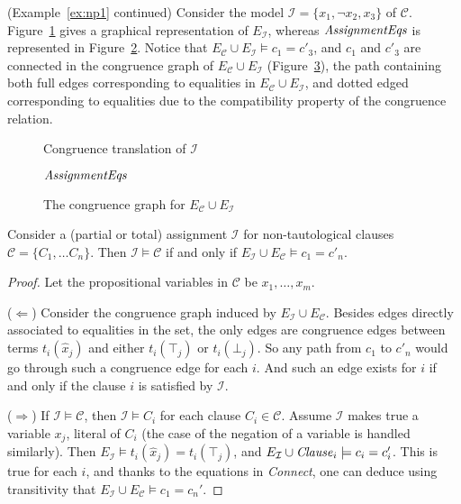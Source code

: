 \documentclass[smallextended]{svjour3}
\newcommand{\Assignment}{{\it AssignmentEqs}}
\newcommand{\Clause}{{\it Clause}}
\newcommand{\Connect}{{\it Connect}}
\begin{document}
\begin{example}\label{ex:np2} (Example~\ref{ex:np1} continued)  
Consider the model $\mathcal{I} = \{x_1, \neg x_2, x_3\}$ of\/ $\mathcal{C}$.
Figure~\ref{fig:npassignment} gives a graphical representation of
$E_{\mathcal{I}}$, whereas $\Assignment$ is represented in
Figure~\ref{fig:npassignmentstar}.  Notice that
$E_{\mathcal{C}} \cup E_{\mathcal{I}} \models c_1 = c'_3$,
and $c_1$ and $c'_3$ are connected in the congruence graph
of $E_{\mathcal{C}} \cup E_{\mathcal{I}}$ (Figure~\ref{fig:npmodel}), the path containing both full edges corresponding to equalities in $E_{\mathcal{C}} \cup E_{\mathcal{I}}$, and dotted edged corresponding to equalities due to the compatibility property of the congruence relation.

\begin{figure}[ht]

\caption{Congruence translation of $\mathcal{I}$}
\label{fig:npassignment}
\end{figure}

\begin{figure}[ht]

\caption{$\Assignment$}
\label{fig:npassignmentstar}
\end{figure}

\begin{figure}[ht]

\caption{The congruence graph for $E_{\mathcal{C}} \cup E_{\mathcal{I}}$}
\label{fig:npmodel}
\end{figure}
\end{example}

\begin{lemma}
\label{lemma:eqv}
Consider a (partial or total) assignment $\mathcal{I}$ for non-tautological
clauses $\mathcal{C}= \{C_1, \dots C_n\}$.  Then $\mathcal{I} \models
\mathcal{C}$ if and only if $E_{\mathcal{I}} \cup E_\mathcal{C} \models c_1 =
c'_n$.
\end{lemma}
\begin{proof}

Let the propositional variables in $\mathcal{C}$ be $x_1,\ldots, x_m$.

($\Leftarrow$)  Consider the congruence graph induced by
$E_{\mathcal{I}} \cup E_\mathcal{C}$.  Besides edges directly associated to
equalities in the set, the only edges are congruence edges between terms
$t_i(\hat{x}_j)$ and either $t_i(\top_j)$ or $t_i(\bot_j)$.  So any path from
$c_1$ to $c'_n$ would go through such a congruence edge for each $i$.
And such an edge exists for $i$ if and only if the clause $i$ is satisfied by
$\mathcal{I}$.

($\Rightarrow$)  If $\mathcal{I} \models \mathcal{C}$, then
$\mathcal{I} \models C_i$ for each clause $C_i \in \mathcal{C}$.  Assume
$\mathcal{I}$ makes true a variable $x_j$, literal of $C_i$ (the case of
the negation of a variable is handled similarly).  Then $E_{\mathcal{I}} \models
t_i(\hat{x}_j) = t_i(\top_j)$, and $E_{\mathcal{I}} \cup \Clause_i
\models c_i = c_i'$.  This is true for each $i$, and
thanks to the equations in \Connect, one can deduce using transitivity that
$E_{\mathcal{I}} \cup E_\mathcal{C} \models c_1 = c_n'$.

\end{proof}
\end{document}
